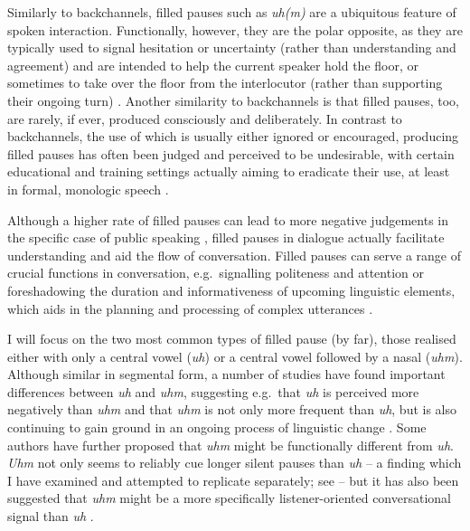 Similarly to backchannels, filled pauses such as \emph{uh(m)} are a ubiquitous feature of spoken interaction. Functionally, however, they are the polar opposite, as they are typically used to signal hesitation or uncertainty (rather than understanding and agreement) and are intended to help the current speaker hold the floor, or sometimes to take over the floor from the interlocutor (rather than supporting their ongoing turn) \citep{belzPhonetikAhUnd2021, benusVariabilityStabilityCollaborative2009, fischerDiscourseParticlesTurntaking2000, schettinoPhoneticFunctionalFeatures2019, shribergErrrrHumanEcology2001, wardNonlexicalConversationalSounds2006}. Another similarity to backchannels is that filled pauses, too, are rarely, if ever, produced consciously and deliberately. In contrast to backchannels, the use of which is usually either ignored or encouraged, producing filled pauses has often been judged and perceived to be undesirable, with certain educational and training settings actually aiming to eradicate their use, at least in formal, monologic speech \citep{erardUmSlipsStumbles2008, fischerCognitiveSemanticsLexical2013, foxtreeInterpretingPausesUms2002, niebuhrNotHesitateUnless2019a, oconnellHistoryResearchFilled2004,smithCourseAnsweringQuestions1993,wardProsodicPatternsEnglish2019}.

Although a higher rate of filled pauses can lead to more negative judgements in the specific case of public speaking \citep{niebuhrNotHesitateUnless2019a}, filled pauses in dialogue actually facilitate understanding and aid the flow of conversation. Filled pauses can serve a range of crucial functions in conversation, e.g.~signalling politeness and attention or foreshadowing the duration and informativeness of upcoming linguistic elements, which aids in the planning and processing of complex utterances \citep{corleyHesitationSpeechCan2003,foxtreeListenersUsesUm2001,fruehwaldFilledPauseChoice2016,levinsonPragmatics1983,niebuhrNotHesitateUnless2019a,schegloffOtherUh2010}.

I will focus on the two most common types of filled pause (by far), those realised either with only a central vowel (\emph{uh}) or a central vowel followed by a nasal (\emph{uhm}). Although similar in segmental form, a number of studies have found important differences between \emph{uh} and \emph{uhm}, suggesting e.g.~that \emph{uh} is perceived more negatively than \emph{uhm} \citep{niebuhrNotHesitateUnless2019a} and that \emph{uhm} is not only more frequent than \emph{uh}, but is also continuing to gain ground in an ongoing process of linguistic change \citep{fruehwaldFilledPauseChoice2016,wielingVariationChangeUse2016}. Some authors have further proposed that \emph{uhm} might be functionally different from \emph{uh}. \emph{Uhm} not only seems to reliably cue longer silent pauses than \emph{uh} \citep{clarkUsingUhUm2002,foxtreeListenersUsesUm2001} -- a finding which I have examined and attempted to replicate separately; see  -- but it has also been suggested that \emph{uhm} might be a more specifically listener-oriented conversational signal than \emph{uh} \citep{gormanUhUmChildren2016,irvineUhUmAutism2016,mcgregorBriefReportUm2020}. 

